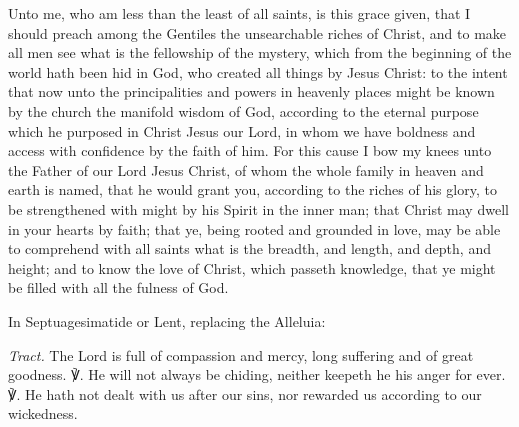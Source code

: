  Unto me, who am less than the least of all saints, is this grace given, that I should preach among the Gentiles the unsearchable riches of Christ, and to make all men see what is the fellowship of the mystery, which from the beginning of the world hath been hid in God, who created all things by Jesus Christ: to the intent that now unto the principalities and powers in heavenly places might be known by the church the manifold wisdom of God, according to the eternal purpose which he purposed in Christ Jesus our Lord, in whom we have boldness and access with confidence by the faith of him. For this cause I bow my knees unto the Father of our Lord Jesus Christ, of whom the whole family in heaven and earth is named, that he would grant you, according to the riches of his glory, to be strengthened with might by his Spirit in the inner man; that Christ may dwell in your hearts by faith; that ye, being rooted and grounded in love, may be able to comprehend with all saints what is the breadth, and length, and depth, and height; and to know the love of Christ, which passeth knowledge, that ye might be filled with all the fulness of God.


\begin{rubric}
{In Septuagesimatide or Lent, replacing the Alleluia:}
\end{rubric}\par\noindent
\textit{Tract.} The Lord is full of compassion and mercy, long suffering and of great goodness. ℣. He will not always be chiding, neither keepeth he his anger for ever. ℣. He hath not dealt with us after our sins, nor rewarded us according to our wickedness.


